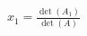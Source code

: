 \documentclass[preview]{standalone}
\begin{document}
\begin{align*}
x_1 = \frac{\det(A_1)}{\det(A)}
\end{align*}
\end{document}
